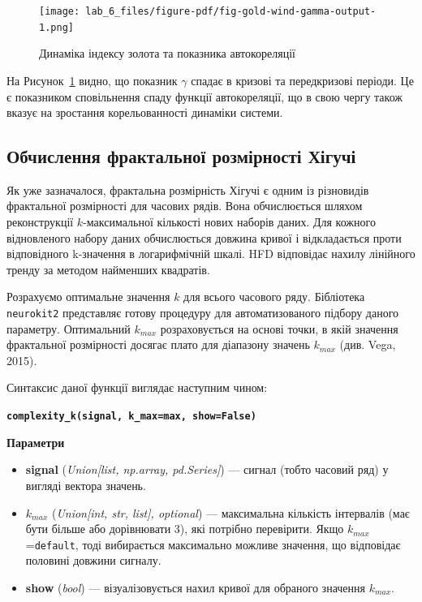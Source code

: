 \documentclass[
  letterpaper,
]{report}
\providecommand{\tightlist}{%
  \setlength{\itemsep}{0pt}\setlength{\parskip}{0pt}}\usepackage{longtable,booktabs,array}
\begin{document}
\begin{figure}[H]

{\centering \texttt{[image: lab\_6\_files/figure-pdf/fig-gold-wind-gamma-output-1.png]}

}

\caption{\label{fig-gold-wind-gamma}Динаміка індексу золота та показника
автокореляції}

\end{figure}

На Рисунок~\ref{fig-gold-wind-gamma} видно, що показник \(\gamma\)
спадає в кризові та передкризові періоди. Це є показником сповільнення
спаду функції автокореляції, що в свою чергу також вказує на зростання
корельованності динаміки системи.

\hypertarget{ux43eux431ux447ux438ux441ux43bux435ux43dux43dux44f-ux444ux440ux430ux43aux442ux430ux43bux44cux43dux43eux457-ux440ux43eux437ux43cux456ux440ux43dux43eux441ux442ux456-ux445ux456ux433ux443ux447ux456}{%
\subsection{Обчислення фрактальної розмірності
Хігучі}\label{ux43eux431ux447ux438ux441ux43bux435ux43dux43dux44f-ux444ux440ux430ux43aux442ux430ux43bux44cux43dux43eux457-ux440ux43eux437ux43cux456ux440ux43dux43eux441ux442ux456-ux445ux456ux433ux443ux447ux456}}

Як уже зазначалося, фрактальна розмірність Хігучі є одним із різновидів
фрактальної розмірності для часових рядів. Вона обчислюється шляхом
реконструкції \(k\)-максимальної кількості нових наборів даних. Для
кожного відновленого набору даних обчислюється довжина кривої і
відкладається проти відповідного k-значення в логарифмічній шкалі. HFD
відповідає нахилу лінійного тренду за методом найменших квадратів.

Розрахуємо оптимальне значення \(k\) для всього часового ряду.
Бібліотека \texttt{neurokit2} представляє готову процедуру для
автоматизованого підбору даного параметру. Оптимальний \(k_{max}\)
розраховується на основі точки, в якій значення фрактальної розмірності
досягає плато для діапазону значень \(k_{max}\) (див. Vega, 2015).

Синтаксис даної функції виглядає наступним чином:

\textbf{\texttt{complexity\_k(signal,\ k\_max=\textquotesingle{}max\textquotesingle{},\ show=False)}}

\textbf{Параметри}

\begin{itemize}
\tightlist
\item
  \textbf{signal} (\emph{Union{[}list, np.array, pd.Series{]}}) ---
  сигнал (тобто часовий ряд) у вигляді вектора значень.
\item
  \textbf{\(k_{max}\)} (\emph{Union{[}int, str, list{]}, optional}) ---
  максимальна кількість інтервалів (має бути більше або дорівнювати 3),
  які потрібно перевірити. Якщо \(k_{max}\)=\texttt{default}, тоді
  вибирається максимально можливе значення, що відповідає половині
  довжини сигналу.
\item
  \textbf{show} (\emph{bool}) --- візуалізовується нахил кривої для
  обраного значення \(k_{max}\).
\end{itemize}
\end{document}
